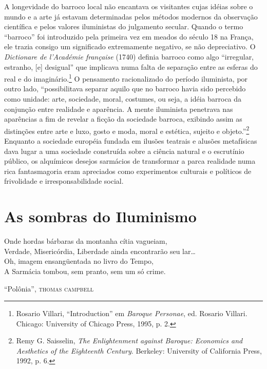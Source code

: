 A longevidade do barroco local não encantava os visitantes cujas idéias
sobre o mundo e a arte já estavam determinadas pelos métodos modernos da
observação científica e pelos valores iluministas do julgamento secular.
Quando o termo ``barroco'' foi introduzido pela primeira vez em meados
do século 18 na França, ele trazia consigo um significado extremamente
negativo, se não depreciativo. O \emph{Dictionare de l'Académie
française} (1740) definia barroco como algo ``irregular, estranho,
{[}e{]} desigual'' que implicava numa falta de separação entre as
esferas do real e do imaginário.\footnote{Rosario Villari,
  ``Introduction'' em \emph{Baroque Personae}, ed. Rosario Villari.
  Chicago: University of Chicago Press, 1995, p. 2.} O pensamento
racionalizado do período iluminista, por outro lado, ``possibilitava
separar aquilo que no barroco havia sido percebido como unidade: arte,
sociedade, moral, costumes, ou seja, a idéia barroca da conjunção entre
realidade e aparência. A mente iluminista penetrava nas aparências a fim
de revelar a ficção da sociedade barroca, exibindo assim as distinções
entre arte e luxo, gosto e moda, moral e estética, sujeito e
objeto.''\footnote{Remy G. Saisselin, \emph{The Enlightenment against
  Baroque: Economics and Aesthetics of the Eighteenth Century}.
  Berkeley: University of California Press, 1992, p. 6.} Enquanto a
sociedade européia fundada em ilusões teatrais e alusões metafísicas
dava lugar a uma sociedade construída sobre a ciência natural e o
escrutínio público, os alquímicos desejos sarmácios de transformar a
parca realidade numa rica fantasmagoria eram apreciados como
experimentos culturais e políticos de frivolidade e irresponsabilidade
social.

%

\chapter{As sombras do Iluminismo}

\epigraph{Onde hordas bárbaras da montanha cítia vagueiam,\\
Verdade, Misericórdia, Liberdade ainda encontrarão \qb{}seu lar\ldots{}\\
Oh, imagem ensangüentada no livro do Tempo,\\
A Sarmácia tombou, sem pranto, sem um só crime.}{``Polônia'', \textsc{thomas campbell}}

